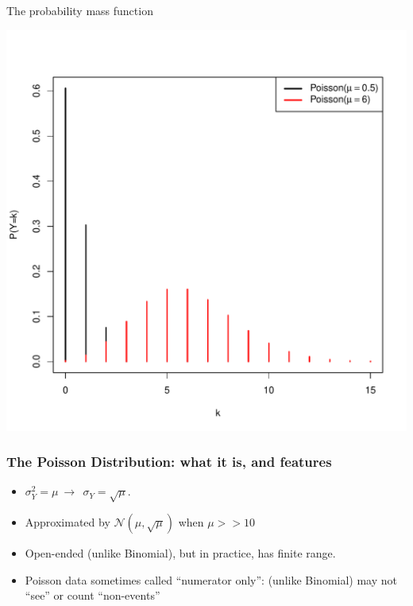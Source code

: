 \documentclass[10pt,handout]{beamer}\usepackage[]{graphicx}\usepackage[]{color}
\makeatletter
\def\maxwidth{ %
  \ifdim\Gin@nat@width>\linewidth
    \linewidth
  \else
    \Gin@nat@width
  \fi
}
\newenvironment{knitrout}{}{} %
\makeatother
\begin{document}
\begin{frame}[fragile]{The probability mass function}
	
\begin{knitrout}\tiny
{}\color{fgcolor}

{\centering \includegraphics[width=\maxwidth]{figure/unnamed-chunk-12-1} 

}


\end{knitrout}
	
\end{frame}


\begin{frame}
	\frametitle{The Poisson Distribution: what it is, and features}
	
	\begin{itemize}
		\setlength\itemsep{2em}
		\item  $\sigma^2_Y =  \mu \ \to \ \ \sigma_Y =  \sqrt{\mu}.$ \pause
		\item  Approximated by $\mathcal{N}(\mu, \sqrt{\mu})$ when $\mu >> 10$ \pause 
		\item Open-ended (unlike Binomial), but in practice, has finite range. 
		
		\item Poisson data sometimes called ``numerator only'':  (unlike Binomial) may not ``see'' or  count ``non-events''
	\end{itemize}
\end{frame}
\end{document}
